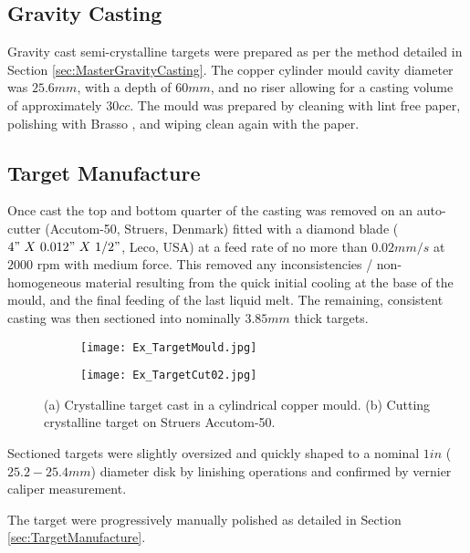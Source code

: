 \subsection{Gravity Casting}
Gravity cast semi-crystalline targets were prepared as per the method detailed in Section \ref{sec:MasterGravityCasting}. The copper cylinder mould cavity diameter was $25.6 mm$, with a depth of $60 mm$, and no riser allowing for a casting volume of approximately $30 cc$. The mould was prepared by cleaning with lint free paper, polishing with Brasso \textcopyright, and wiping clean again with the paper.

\subsection{Target Manufacture}
Once cast the top and bottom quarter of the casting was removed on an auto-cutter (Accutom-50, Struers, Denmark) fitted with a diamond blade ($4"~ X~ 0.012"~ X~ 1/2"$, Leco, USA) at a feed rate of no more than $0.02 mm/s$ at $2000$ \acrshort{rpm} with medium force. This removed any inconsistencies / non-homogeneous material resulting from the quick initial cooling at the base of the mould, and the final feeding of the last liquid melt. The remaining, consistent casting was then sectioned into nominally $3.85 mm$ thick targets.

\begin{figure}[htbp]
	\begin{subfigure}[htbp]{0.463\textwidth}
		\texttt{[image: Ex\_TargetMould.jpg]}
		\caption{}
		\label{fig:Xtal_Casting_Target}
	\end{subfigure}
	\begin{subfigure}[htbp]{0.45\textwidth}
		\texttt{[image: Ex\_TargetCut02.jpg]}
		\caption{}
		\label{fig:Xtal_Cutting_Target}
	\end{subfigure}
	\caption{(a) Crystalline target cast in a cylindrical copper mould. (b) Cutting crystalline target on Struers Accutom-50.}%
	\label{fig:Xtal_Target}
\end{figure}

Sectioned targets were slightly oversized and quickly shaped to a nominal $1 in$ ($25.2 - 25.4 mm$) diameter disk by linishing operations and confirmed by vernier caliper measurement.

The target were progressively manually polished as detailed in Section \ref{sec:TargetManufacture}.

